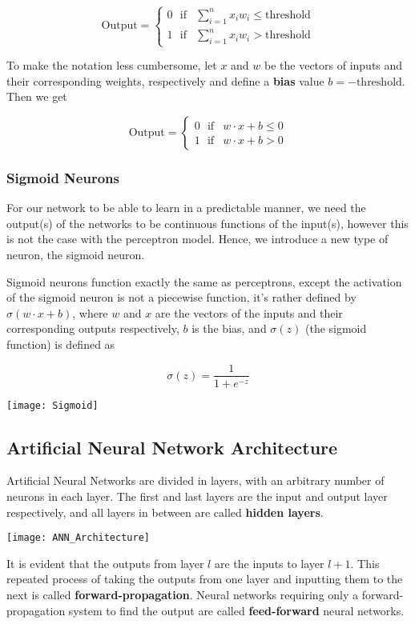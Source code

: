 \documentclass{article}
\begin{document}
\begin{equation}
\text{Output} =
\begin{cases} 
    0 \ \ \ \text{if} & \sum_{i=1}^{n}{x_{i}w_{i}} \le \text{threshold} \\
    1 \ \ \ \text{if} & \sum_{i=1}^{n}{x_{i}w_{i}} > \text{threshold}
\end{cases}
\end{equation}

To make the notation less cumbersome, let $x$ and $w$ be the vectors of inputs and their corresponding weights, respectively and define a \textbf{bias} value $b=-\text{threshold}$. Then we get

\begin{equation}
\text{Output} =
\begin{cases} 
    0 \ \ \ \text{if} & w \cdot x + b \le 0 \\
    1 \ \ \ \text{if} & w \cdot x + b > 0
\end{cases}
\end{equation}

\subsubsection{Sigmoid Neurons}

For our network to be able to learn in a predictable manner, we need the output(s) of the networks to be continuous functions of the input(s), however this is not the case with the perceptron model. Hence, we introduce a new type of neuron, the sigmoid neuron.

Sigmoid neurons function exactly the same as perceptrons, except the activation of the sigmoid neuron is not a piecewise function, it's rather defined by $\sigma(w \cdot x + b)$, where $w$ and $x$ are the vectors of the inputs and their corresponding outputs respectively, $b$ is the bias, and $\sigma(z)$ (the sigmoid function) is defined as

\begin{equation}
    \sigma(z)=\frac{1}{1+e^{-z}}    
\end{equation}
\begin{center}
    \texttt{[image: Sigmoid]}
\end{center}

\subsection{Artificial Neural Network Architecture}
Artificial Neural Networks are divided in layers, with an arbitrary number of neurons in each layer. The first and last layers are the input and output layer respectively, and all layers in between are called \textbf{hidden layers}.
\begin{center}
    \texttt{[image: ANN\_Architecture]}
\end{center}
It is evident that the outputs from layer $l$ are the inputs to layer $l+1$. This repeated process of taking the outputs from one layer and inputting them to the next is called \textbf{forward-propagation}. Neural networks requiring only a forward-propagation system to find the output are called \textbf{feed-forward} neural networks.
\end{document}
